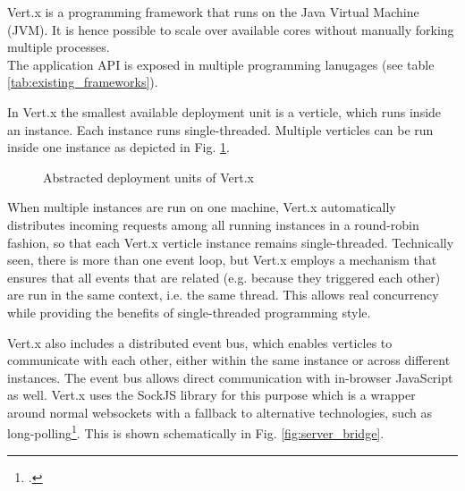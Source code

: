 Vert.x is a programming framework that runs on the Java Virtual Machine (JVM).
It is hence possible to scale over
available cores without manually forking multiple processes.\\
The application API is exposed in multiple programming lanugages (see table
\ref{tab:existing_frameworks}).

In Vert.x the smallest available deployment unit is a verticle, which runs
inside an instance. Each instance runs single-threaded.
Multiple verticles can be run inside one instance as depicted in Fig.
\ref{fig:vertx_constructs}.

\begin{figure}[h]
	\centering
	\setlength\fboxsep{2pt}
	\caption{Abstracted deployment units of Vert.x}
	\label{fig:vertx_constructs}
\end{figure}

When multiple instances are run on one machine, Vert.x automatically distributes incoming
requests among all running instances in a round-robin fashion, so that each
Vert.x verticle instance remains single-threaded. Technically seen, there is
more than one event loop, but Vert.x employs a mechanism that ensures that all events
that are related (e.g. because they triggered each other) are run in the same context, i.e. the same thread.
This allows real concurrency while providing the benefits of single-threaded programming style.

Vert.x also includes a distributed event bus, which enables verticles to
communicate with each other, either within the same instance or across different
instances. The event bus allows direct communication with in-browser JavaScript as well.
Vert.x uses the SockJS library for this purpose which is a wrapper around normal websockets with a
fallback to alternative technologies, such as long-polling\footcite[Cf.][]{sockjs_2013}.
This is shown schematically in Fig. \ref{fig:server_bridge}.

